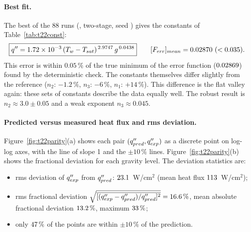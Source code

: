 \paragraph{Best fit.}
The best of the 88 runs (\TwoTwoBestSet, two-stage, seed \TwoTwoBestSeed) gives the constants of
Table~\ref{tab:t22const}:
\[
\boxed{q''=1.72\times10^{-3}\,(T_w-T_{sat})^{\,2.9747}\,g^{\,0.0438}}\qquad
[F_{err}]_{mean}=0.02870\ (<0.035).
\]
This error is within $0.05\,\%$ of the true minimum of the error function ($0.02869$) found by the
deterministic check. The constants themselves differ slightly from the reference ($n_2$: $-1.2\,\%$,
$n_3$: $-6\,\%$, $n_1$: $+14\,\%$). This difference is the flat valley again: these sets of constants
describe the data equally well. The robust result is $n_2\approx3.0\pm0.05$ and a weak exponent
$n_3\approx0.045$.

\begin{table}[H]
\centering\small
\caption{Task 2.2: constants of Eq.~(1.1) printed by the program (MINIMUM = population-average constants
at the minimum of $\Ferrmean$, ENDING = last generation, TIME AVG = average over generations 801--NGEN).
$^\dagger$the TIME AVG error printed by the skeleton is the average of $\Ferrmean$ over all generations.}
\label{tab:t22const}
\end{table}

\paragraph{Predicted versus measured heat flux and rms deviation.}
Figure~\ref{fig:t22parity}(a) shows each pair $(q''_{pred},q''_{exp})$ as a discrete point on log-log
axes, with the line of slope 1 and the $\pm10\,\%$ lines. Figure~\ref{fig:t22parity}(b) shows the
fractional deviation for each gravity level. The deviation statistics are:
\begin{itemize}
  \item rms deviation of $q''_{exp}$ from $q''_{pred}$: $23.1$~W/cm$^2$ (mean heat flux
        $113$~W/cm$^2$);
  \item rms fractional deviation $\sqrt{\overline{[(q''_{exp}-q''_{pred})/q''_{pred}]^2}}=16.6\,\%$,
        mean absolute fractional deviation $13.2\,\%$, maximum $33\,\%$;
  \item only $47\,\%$ of the points are within $\pm10\,\%$ of the prediction.
\end{itemize}


